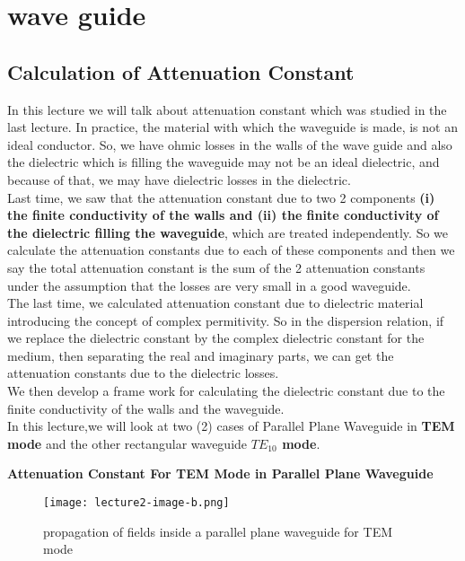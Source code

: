 \chapter{wave guide}
\section{\textbf{Calculation of Attenuation Constant}}
In this lecture we will talk about attenuation constant which was studied in the last lecture. In practice, the material with which the waveguide is made, is not an ideal conductor. So, we have ohmic losses in the walls  of the wave guide and also the dielectric which is filling the waveguide may not be an ideal dielectric, and because of that, we may have dielectric losses in the dielectric.\\ Last time, we saw that the attenuation constant due to two {2} components \textbf{(i) the finite conductivity of the walls and (ii) the finite conductivity of the dielectric filling the waveguide}, which are treated independently. So we calculate the attenuation constants due to each of these components and then we say the total attenuation constant is the sum of the 2 attenuation constants under the assumption that the losses are very small in a good waveguide.\\ The last time, we calculated attenuation constant due to dielectric material introducing the concept of complex permitivity. So in the dispersion relation, if we replace the dielectric constant by the complex dielectric constant for the medium, then separating the real and imaginary parts, we can get the attenuation constants due to the dielectric losses.\\ We then develop a frame work for calculating the dielectric constant due to the finite conductivity of the walls and the waveguide.\\ In this lecture,we will look at two (2) cases of Parallel Plane Waveguide in \textbf{TEM mode} and the other rectangular waveguide \textbf{$TE_{10}$ mode}.\\

\begin{center}
	\textbf{Attenuation Constant For TEM Mode in Parallel Plane Waveguide}
\end{center}

\begin{figure}[H]
	\centering
	\texttt{[image: lecture2-image-b.png]}
	\caption{propagation of fields inside a parallel plane waveguide for TEM mode}
\end{figure}

